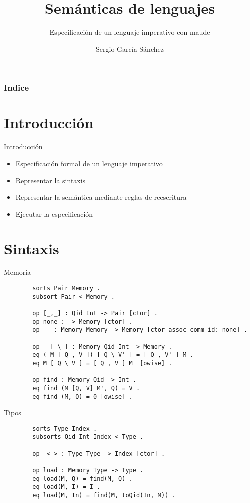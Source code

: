 \documentclass{beamer}
\title{Semánticas de lenguajes}
\subtitle{Especificación de un lenguaje imperativo con maude}
\author{Sergio García Sánchez}
\institute{UCM}
\date{\mydate}
\begin{document}
    \begin{frame}
        \titlepage
    \end{frame}

    \begin{frame}
        \frametitle{Indice}
        \tableofcontents
    \end{frame}


    \section{Introducción}
    \begin{frame}{Introducción}
        \begin{itemize}
            \item Especificación formal de un lenguaje imperativo
            \item Representar la sintaxis
            \item Representar la semántica mediante reglas de reescritura
            \item Ejecutar la especificación
        \end{itemize}
    \end{frame}

    \section{Sintaxis}
    \begin{frame}[fragile]{Memoria}
        \begin{verbatim}
        sorts Pair Memory .
        subsort Pair < Memory .
    
        op [_,_] : Qid Int -> Pair [ctor] .
        op none : -> Memory [ctor] .
        op __ : Memory Memory -> Memory [ctor assoc comm id: none] .

        op _ [_\_] : Memory Qid Int -> Memory .
        eq ( M [ Q , V ]) [ Q \ V' ] = [ Q , V' ] M .
        eq M [ Q \ V ] = [ Q , V ] M  [owise] .
        
        op find : Memory Qid -> Int .
        eq find (M [Q, V] M', Q) = V .
        eq find (M, Q) = 0 [owise] .
        \end{verbatim}
    \end{frame}

    \begin{frame}[fragile]{Tipos}
        \begin{verbatim}
        sorts Type Index .
        subsorts Qid Int Index < Type .

        op _<_> : Type Type -> Index [ctor] .

        op load : Memory Type -> Type .
        eq load(M, Q) = find(M, Q) .
        eq load(M, I) = I .
        eq load(M, In) = find(M, toQid(In, M)) .
        \end{verbatim}
    \end{frame}
\end{document}
